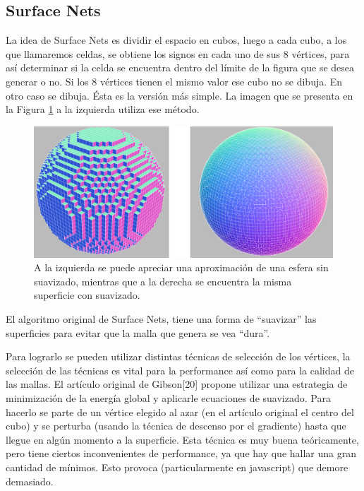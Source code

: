\documentclass[12pt]{article}
\begin{document}
\subsection{Surface Nets}
\noindent La idea de Surface Nets es dividir el espacio en cubos, luego a cada cubo, a los que llamaremos celdas, se obtiene los signos en cada uno de sus 8 vértices, para así determinar si la celda se encuentra dentro del límite de la figura que se desea generar o no. Si los 8 vértices tienen el mismo valor ese cubo no se dibuja. En otro caso se dibuja. Ésta es la versión más simple. La imagen que se presenta en la Figura \ref{minecraft} a la izquierda utiliza ese método.
\begin{figure}[h]
\includegraphics[width =\linewidth,center]{snc.png}
\caption{ A la izquierda se puede apreciar una aproximación de una esfera sin suavizado, mientras que a la derecha se encuentra la misma superficie con suavizado.}
\label{minecraft}
\end{figure}

El algoritmo original de Surface Nets\cite{surfacenets}, tiene una forma de “suavizar” las superficies para evitar  que la malla que genera se vea “dura”.

Para lograrlo se pueden utilizar distintas técnicas de selección de los vértices, la selección de las técnicas es vital para la performance así como para la calidad de las mallas. El artículo original de Gibson[20]  propone utilizar una estrategia de minimización de la energía global y aplicarle ecuaciones de suavizado. Para hacerlo se parte de un vértice elegido al azar (en el artículo original el centro del cubo)  y se perturba (usando la técnica de descenso por el gradiente) hasta que llegue en algún momento a la superficie. Esta técnica es muy buena teóricamente, pero tiene ciertos inconvenientes de performance, ya que hay que hallar una gran cantidad de mínimos. Esto provoca (particularmente en javascript) que demore demasiado.
\end{document}
